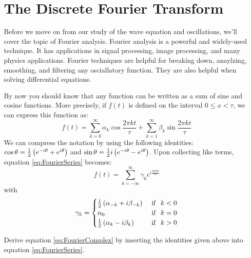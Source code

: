 \chapter{The Discrete Fourier Transform}
\label{Lab:16}

Before we move on from our study of the wave equation and
oscillations, we'll cover the topic of Fourier analysis.  Fourier
analysis is a powerful and widely-used technique.  It has applications
in signal processing, image processing, and many physics
applications.  Fourier techniques are helpful for breaking down,
anaylzing, smoothing, and filtering any osciallatory function.  They
are also helpful when solving differential equations.



By now you should know that any function can be written as a sum of
sine and cosine functions.  More precisely, if $f(t)$ is defined on
the interval $0 \le x < \tau$, we can express this function as:
\begin{equation}\label{eq:FourierSeries}
f(t) = \sum_{k=0}^{\infty} \alpha_k \cos{ \frac{2 \pi k t}{\tau}} + \sum_{k=1}^{\infty} \beta_k \sin{ \frac{2 \pi k t}{\tau}} 
\end{equation}
We can compress the notation by using the following identities:
$\cos\theta ={1\over 2}\left( e^{-i\theta} + e^{i \theta}\right)$ and $\sin\theta
={1\over 2}i \left(e^{-i\theta} - e^{i \theta}\right)$.  Upon collecting like
terms, equation \ref{eq:FourierSeries} becomes:
\begin{equation}\label{eq:FourierComplex}
f(t) = \sum_{k=-\infty}^{\infty} \gamma_k e^{i \frac{2 \pi k t}{\tau}}
\end{equation}
with
\begin{equation}\label{eq:cases}
\gamma_k = 
\begin{cases}
{1\over 2} \left( \alpha_{-k} + i \beta_{-k}\right) & \mathrm{~if~~} k < 0\\
\alpha_0 & \mathrm{~if~~} k = 0\\
{1\over 2} \left( \alpha_{k} - i \beta_{k}\right) & \mathrm{~if~~} k > 0\\
\end{cases}
\end{equation}

\begin{enumerate}
\probtwo Derive equation \ref{eq:FourierComplex} by inserting the
identities given above into equation \ref{eq:FourierSeries}. 
\end{enumerate}


